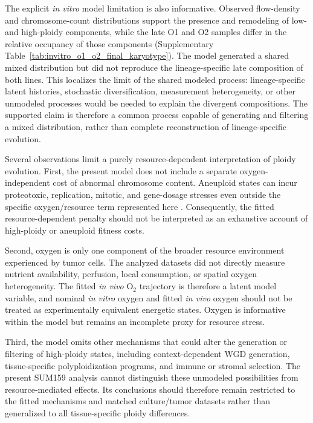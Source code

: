 \documentclass[11pt]{article}
\begin{document}
The explicit \textit{in vitro} model limitation is also informative. Observed flow-density and chromosome-count distributions support the presence and remodeling of low- and high-ploidy components, while the late O1 and O2 samples differ in the relative occupancy of those components (Supplementary Table~\ref{tab:invitro_o1_o2_final_karyotype}). The model generated a shared mixed distribution but did not reproduce the lineage-specific late composition of both lines. This localizes the limit of the shared modeled process: lineage-specific latent histories, stochastic diversification, measurement heterogeneity, or other unmodeled processes would be needed to explain the divergent compositions. The supported claim is therefore a common process capable of generating and filtering a mixed distribution, rather than complete reconstruction of lineage-specific evolution.

Several observations limit a purely resource-dependent interpretation of ploidy evolution. First, the present model does not include a separate oxygen-independent cost of abnormal chromosome content. Aneuploid states can incur proteotoxic, replication, mitotic, and gene-dosage stresses even outside the specific oxygen/resource term represented here \cite{santaguida_chromosome_2017,sheltzer_single-chromosome_2017,kuznetsova_chromosomal_2015}. Consequently, the fitted resource-dependent penalty should not be interpreted as an exhaustive account of high-ploidy or aneuploid fitness costs.

Second, oxygen is only one component of the broader resource environment experienced by tumor cells. The analyzed datasets did not directly measure nutrient availability, perfusion, local consumption, or spatial oxygen heterogeneity. The fitted \textit{in vivo} O$_2$ trajectory is therefore a latent model variable, and nominal \textit{in vitro} oxygen and fitted \textit{in vivo} oxygen should not be treated as experimentally equivalent energetic states. Oxygen is informative within the model but remains an incomplete proxy for resource stress.

Third, the model omits other mechanisms that could alter the generation or filtering of high-ploidy states, including context-dependent WGD generation, tissue-specific polyploidization programs, and immune or stromal selection. The present SUM159 analysis cannot distinguish these unmodeled possibilities from resource-mediated effects. Its conclusions should therefore remain restricted to the fitted mechanisms and matched culture/tumor datasets rather than generalized to all tissue-specific ploidy differences.
\end{document}
